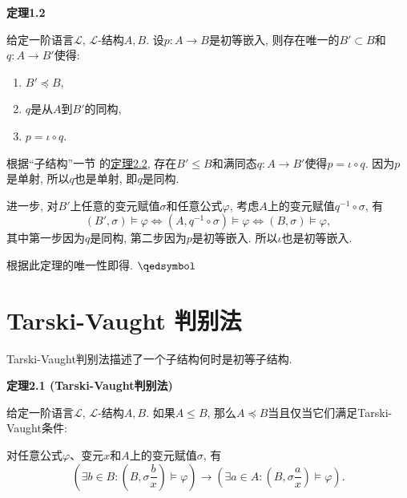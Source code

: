 \documentclass[UTF8]{ctexart}
\begin{document}
\vspace{10pt}

\hypertarget{sec:定理1.2}{}
\noindent\textbf{定理1.2}

给定一阶语言$\mathcal{L}$, $\mathcal{L}$-结构$A,B$.
设$p:A\to B$是初等嵌入, 则存在唯一的$B'\subset B$和$q:A\to B'$使得:
\begin{enumerate}
    \item $B'\preccurlyeq B$,
    \item $q$是从$A$到$B'$的同构,
    \item $p=\iota\circ q$.
\end{enumerate}



根据``子结构''一节
的\href{../01 一阶语言的结构/03 子结构#nameddest=sec:定理2.2}{定理2.2},
存在$B'\leqslant B$和满同态$q:A\to B'$使得$p=\iota\circ q$.
因为$p$是单射, 所以$q$也是单射, 即$q$是同构.

进一步, 对$B'$上任意的变元赋值$\sigma$和任意公式$\varphi$,
考虑$A$上的变元赋值$q^{-1}\circ\sigma$, 有
\[
    (B',\sigma)\models\varphi\iff(A,q^{-1}\circ\sigma)\models\varphi\iff
    (B,\sigma)\models\varphi,
\]
其中第一步因为$q$是同构, 第二步因为$p$是初等嵌入. 所以$\iota$也是初等嵌入.


根据此定理的唯一性即得. \hfill $\qedsymbol$





\newpage

\section{Tarski-Vaught 判别法}

Tarski-Vaught判别法描述了一个子结构何时是初等子结构.

\vspace{10pt}

\hypertarget{sec:定理2.1}{}
\noindent\textbf{定理2.1 (Tarski-Vaught判别法)}

给定一阶语言$\mathcal{L}$, $\mathcal{L}$-结构$A,B$. 如果$A\leqslant B$,
那么$A\preccurlyeq B$当且仅当它们满足Tarski-Vaught条件:

对任意公式$\varphi$、变元$x$和$A$上的变元赋值$\sigma$, 有
\[
    \left(\exists b\in B:\left(B,\sigma\frac{b}{x}\right)\models\varphi\right)\to
    \left(\exists a\in A:\left(B,\sigma\frac{a}{x}\right)\models\varphi\right).
\]
\end{document}
